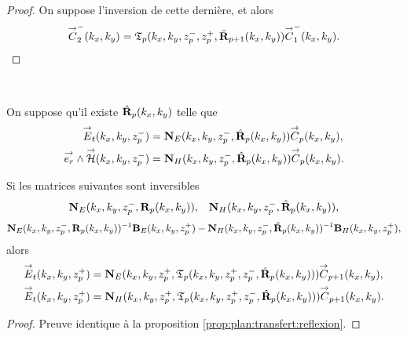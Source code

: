 \begin{proof}
      On suppose l'inversion de cette dernière, et alors
      \begin{equation*}
        {\overset{\rightarrow}{C}}_{2}^-(k_x,k_y) = \mathfrak{T}_p(k_x,k_y,z_p^-,z_p^+,\hat{\mathbf{R}}_{p+1}(k_x,k_y)) {\overset{\rightarrow}{C}}_{1}^-(k_x,k_y).
      \end{equation*}
    \end{proof}

    \begin{prop}%
      \label{prop:plan:relevement:reflexion}{}~

      On suppose qu'il existe \(\hat{\mathbf{R}}_{p}(k_x,k_y)\) telle que 
      \begin{align*}
        {\overset{\rightarrow}{E}}_t(k_x,k_y,z_p^-) &= \mathbf{N}_{E}(k_x,k_y,z_p^-,\hat{\mathbf{R}}_{p}(k_x,k_y)){\overset{\rightarrow}{C}}_{p}(k_x,k_y),
        \\
        {\overset{\rightarrow}{e_r}}\wedge{\overset{\rightarrow}{\mathcal{H}}}(k_x,k_y,z_p^-) &= \mathbf{N}_{H}(k_x,k_y,z_p^-,\hat{\mathbf{R}}_{p}(k_x,k_y)){\overset{\rightarrow}{C}}_{p}(k_x,k_y).
      \end{align*}

      Si les matrices suivantes sont inversibles
      \begin{align*}
        \mathbf{N}_{E}(k_x,k_y,z_p^-,\mathbf{R}_{p}(k_x,k_y)), && \mathbf{N}_{H}(k_x,k_y,z_p^-,\hat{\mathbf{R}}_{p}(k_x,k_y)),
      \end{align*}
      \begin{align*}
        \mathbf{N}_{E}(k_x,k_y,z_p^-,\mathbf{R}_{p}(k_x,k_y))^{-1}\mathbf{B}_{E}(k_x,k_y,z_p^+) - \mathbf{N}_{H}(k_x,k_y,z_p^-,\hat{\mathbf{R}}_{p}(k_x,k_y))^{-1}\mathbf{B}_{H}(k_x,k_y,z_p^+),
      \end{align*}
      alors
      \begin{align*}
        {\overset{\rightarrow}{E}}_t(k_x,k_y,z_p^+) &= \mathbf{N}_{E}(k_x,k_y,z_p^+,\mathfrak{T}_p(k_x,k_y,z_p^+,z_p^-,\hat{\mathbf{R}}_{p}(k_x,k_y))){\overset{\rightarrow}{C}}_{p+1}(k_x,k_y),
        \\
        {\overset{\rightarrow}{E}}_t(k_x,k_y,z_p^+) &= \mathbf{N}_{H}(k_x,k_y,z_p^+,\mathfrak{T}_p(k_x,k_y,z_p^+,z_p^-,\hat{\mathbf{R}}_{p}(k_x,k_y))){\overset{\rightarrow}{C}}_{p+1}(k_x,k_y).
      \end{align*}
    \end{prop}

    \begin{proof}
     Preuve identique à la proposition \ref{prop:plan:transfert:reflexion}.
    \end{proof}

